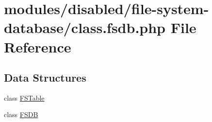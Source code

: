 \hypertarget{class_8fsdb_8php}{\section{modules/disabled/file-\/system-\/database/class.fsdb.\-php File Reference}
\label{class_8fsdb_8php}
}
\subsection*{Data Structures}
\begin{DoxyCompactItemize}
\item 
class \hyperlink{class_f_s_table}{F\-S\-Table}
\item 
class \hyperlink{class_f_s_d_b}{F\-S\-D\-B}
\end{DoxyCompactItemize}

